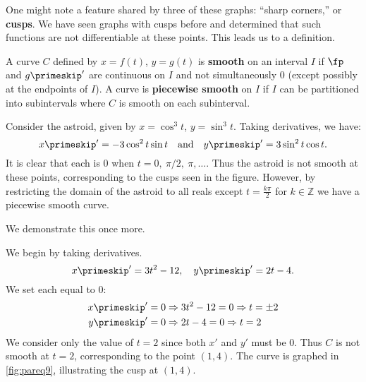 One might note a feature shared by three of these graphs: ``sharp corners,'' or \textbf{cusps}. We have seen graphs with cusps before and determined that such functions are not differentiable at these points. This leads us to a definition.

{A curve $C$ defined by $x=f(t)$, $y=g(t)$ is \textbf{smooth} on an interval $I$ if $\fp$ and $g\primeskip'$ are continuous on $I$ and not simultaneously 0 (except possibly at the endpoints of $I$). A curve is \textbf{piecewise smooth} on $I$ if $I$ can be partitioned into subintervals where $C$ is smooth on each subinterval.
}

Consider the astroid, given by $x=\cos^3t$, $y=\sin^3t$. Taking derivatives, we have:
\[
x\primeskip' = -3\cos^2t\sin t\quad \text{and}\quad y\primeskip' = 3\sin^2t\cos t.
\]
It is clear that each is 0 when $t=0,\ \pi/2,\ \pi,\dotsc$. Thus the astroid is not smooth at these points, corresponding to the cusps seen in the figure. However, by restricting the domain of the astroid to all reals except $t = \frac{k\pi}{2}$ for $k \in\mathbb{Z}$ we have a piecewise smooth curve.

We demonstrate this once more.

{We begin by taking derivatives.
%
%
\[x\primeskip' = 3t^2-12,\quad y\primeskip' = 2t-4.\]
We set each equal to 0:
\begin{align*}
 x\primeskip' =0 &\Rightarrow 3t^2-12=0 \Rightarrow t=\pm 2\\
 y\primeskip' =0 &\Rightarrow 2t-4 = 0 \Rightarrow t=2
\end{align*}
We consider only the value of $t=2$ since both $x'$ and $y'$ must be 0. Thus $C$ is not smooth at $t=2$, corresponding to the point $(1,4)$. The curve is graphed in \autoref{fig:pareq9}, illustrating the cusp at $(1,4)$.}


